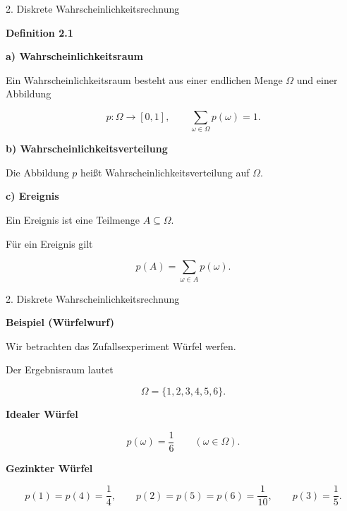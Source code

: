 \documentclass{beamer}
\begin{document}
\begin{frame}{2. Diskrete Wahrscheinlichkeitsrechnung}

\textbf{Definition 2.1}

\vspace{0.2cm}

\textbf{a) Wahrscheinlichkeitsraum}

Ein Wahrscheinlichkeitsraum besteht aus einer endlichen Menge
\(\Omega\) und einer Abbildung

\[
p:\Omega\to[0,1],
\qquad
\sum_{\omega\in\Omega}p(\omega)=1.
\]

\vspace{0.2cm}

\textbf{b) Wahrscheinlichkeitsverteilung}

Die Abbildung \(p\) heißt Wahrscheinlichkeitsverteilung auf \(\Omega\).

\vspace{0.2cm}

\textbf{c) Ereignis}

Ein Ereignis ist eine Teilmenge \(A\subseteq\Omega\).

Für ein Ereignis gilt

\[
p(A)=\sum_{\omega\in A}p(\omega).
\]

\end{frame}

\begin{frame}{2. Diskrete Wahrscheinlichkeitsrechnung}

\textbf{Beispiel (Würfelwurf)}

\vspace{0.3cm}

Wir betrachten das Zufallsexperiment
\glqq Würfel werfen\grqq.

\vspace{0.3cm}

Der Ergebnisraum lautet

\[
\Omega=\{1,2,3,4,5,6\}.
\]

\vspace{0.4cm}

\textbf{Idealer Würfel}

\[
p(\omega)=\frac16
\qquad (\omega\in\Omega).
\]

\vspace{0.4cm}

\textbf{Gezinkter Würfel}

\[
p(1)=p(4)=\frac14,
\qquad
p(2)=p(5)=p(6)=\frac1{10},
\qquad
p(3)=\frac15.
\]

\end{frame}
\end{document}
